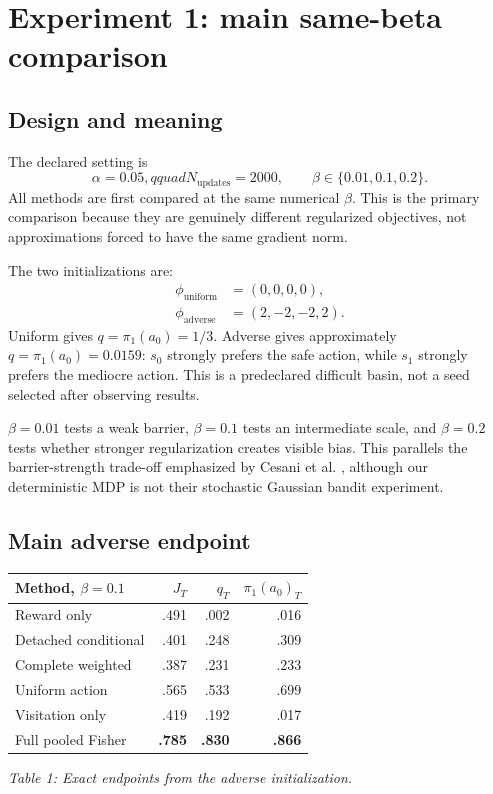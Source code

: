 \documentclass[10pt,a4paper]{article}
\begin{document}
\section{Experiment 1: main same-beta comparison}

\subsection{Design and meaning}

The declared setting is
\begin{equation}
\alpha=0.05,qquad N_{\mathrm{updates}}=2000,
\qquad\beta\in\{0.01,0.1,0.2\}.
\end{equation}
All methods are first compared at the same numerical $\beta$.  This is the
primary comparison because they are genuinely different regularized
objectives, not approximations forced to have the same gradient norm.

The two initializations are:
\begin{align}
\phi_{\mathrm{uniform}}&=(0,0,0,0),\\
\phi_{\mathrm{adverse}}&=(2,-2,-2,2).
\end{align}
Uniform gives $q=\pi_1(a_0)=1/3$.  Adverse gives approximately
$q=\pi_1(a_0)=0.0159$: $s_0$ strongly prefers the safe action, while $s_1$
strongly prefers the mediocre action.  This is a predeclared difficult basin,
not a seed selected after observing results.

$\beta=0.01$ tests a weak barrier, $\beta=0.1$ tests an intermediate scale, and
$\beta=0.2$ tests whether stronger regularization creates visible bias.  This
parallels the barrier-strength trade-off emphasized by Cesani et al.
\cite[Secs.~6.1 and E.2/E.5]{cesani2026}, although our deterministic MDP is not
their stochastic Gaussian bandit experiment.

\subsection{Main adverse endpoint}

\begin{center}\small
\begin{tabular}{lrrr}
\toprule Method, $\beta=0.1$ & $J_T$ & $q_T$ & $\pi_1(a_0)_T$\\ \midrule
Reward only & .491 & .002 & .016\\
Detached conditional & .401 & .248 & .309\\
Complete weighted & .387 & .231 & .233\\
Uniform action & .565 & .533 & .699\\
Visitation only & .419 & .192 & .017\\
Full pooled Fisher & \textbf{.785} & \textbf{.830} & \textbf{.866}\\ \bottomrule
\end{tabular}
\par\smallskip\textit{Table 1: Exact endpoints from the adverse initialization.}
\end{center}
\end{document}
